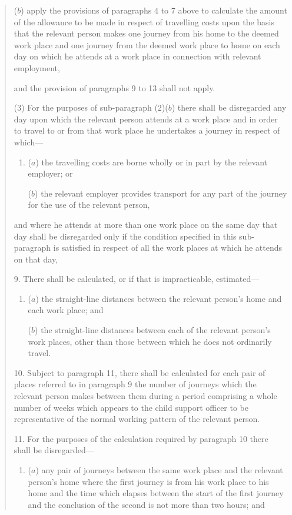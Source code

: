 \documentclass[a4paper]{article}
\begin{document}
\begin{quotation}
\begin{enumerate}
($b$) apply the provisions of paragraphs 4 to 7 above to calculate the amount of the allowance to be made in respect of travelling costs upon the basis that the relevant person makes one journey from his home to the deemed work place and one journey from the deemed work place to home on each day on which he attends at a work place in connection with relevant employment,
\end{enumerate}
and the provision of paragraphs 9 to 13 shall not apply.

(3) For the purposes of sub-paragraph (2)($b$) there shall be disregarded any day upon which the relevant person attends at a work place and in order to travel to or from that work place he undertakes a journey in respect of which—
\begin{enumerate}\item[]
($a$) the travelling costs are borne wholly or in part by the relevant employer; or

($b$) the relevant employer provides transport for any part of the journey for the use of the relevant person,
\end{enumerate}
and where he attends at more than one work place on the same day that day shall be disregarded only if the condition specified in this sub-paragraph is satisfied in respect of all the work places at which he attends on that day,

\medskip

9.  There shall be calculated, or if that is impracticable, estimated—
\begin{enumerate}\item[]
($a$) the straight-line distances between the relevant person’s home and each work place; and

($b$) the straight-line distances between each of the relevant person’s work places, other than those between which he does not ordinarily travel.
\end{enumerate}

\medskip

10.  Subject to paragraph 11, there shall be calculated for each pair of places referred to in paragraph 9 the number of journeys which the relevant person makes between them during a period comprising a whole number of weeks which appears to the child support officer to be representative of the normal working pattern of the relevant person.

\medskip

11.  For the purposes of the calculation required by paragraph 10 there shall be disregarded—
\begin{enumerate}\item[]
($a$) any pair of journeys between the same work place and the relevant person’s home where the first journey is from his work place to his home and the time which elapses between the start of the first journey and the conclusion of the second is not more than two hours; and


\end{enumerate}
\end{quotation}
\end{document}
